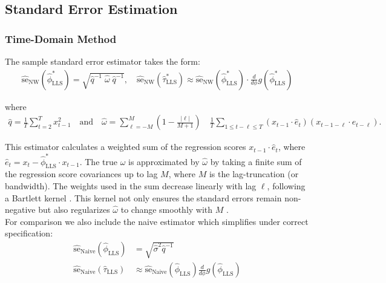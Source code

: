 \documentclass[main.tex]{subfiles}
\begin{document}
\subsection{Standard Error Estimation}
\subsubsection{Time-Domain Method}\label{sec:stderr-time-domain_}
The sample standard error estimator takes the form:
\begin{align}\label{eq:stderr-time-domain_}
\widehat{\text{se}}_{\text{NW}}(\hat\phi^*_{\scriptscriptstyle\text{LLS}}) = \sqrt{\hat q^{-1}\;\hat\omega\; \hat q^{-1}}, \quad
\widehat{\text{se}}_{\text{NW}}(\hat\tau^*_{\scriptscriptstyle\text{LLS}}) \approx \widehat{\text{se}}_{\text{NW}}(\hat\phi^*_{\scriptscriptstyle\text{LLS}}) \cdot \frac{d}{d\phi} g(\hat\phi^*_{\scriptscriptstyle\text{LLS}})
\end{align}

\noindent where
\begin{align}\label{eq:lls_q_omega_}
    \hat q = \frac{1}{T} \sum_{t=2}^T x_{t-1}^2 \quad\text{and}\quad
    \hat \omega = \sum_{\ell=-M}^M \left(1 - \frac{|\ell|}{M+1}\right) \quad \frac{1}{T} \sum_{1\le t - \ell \le T} (x_{t-1} \cdot \hat e_t)(x_{t-1-\ell} \cdot \hat e_{t-\ell}).
\end{align}

\noindent This estimator calculates a weighted sum of the regression scores $x_{t-1} \cdot \hat e_t$, where $\hat e_t = x_t - \hat\phi^*_{\scriptscriptstyle\text{LLS}} \cdot x_{t-1}$. The true $\omega$ is approximated by $\hat \omega$ by taking a finite sum of the regression score covariances up to lag $M$, where $M$ is the lag-truncation (or bandwidth). The weights used in the sum decrease linearly with lag $\ell$, following a Bartlett kernel \citep{newey_simple_1987}. This kernel not only ensures the standard errors remain non-negative but also regularizes $\hat \omega$ to change smoothly with $M$ \citep[Chapter~14.35]{hansen_econometrics_2022}.\\

\noindent For comparison we also include the naive estimator which simplifies under correct specification:
\begin{align}
    \widehat{\text{se}}_\text{Naive}(\hat\phi_{\scriptscriptstyle\text{LLS}}) &= \sqrt{\hat\sigma^2 \hat q^{-1}}\\
    \widehat{\text{se}}_\text{Naive}(\hat\tau_{\scriptscriptstyle\text{LLS}}) &\approx \widehat{\text{se}}_{\text{Naive}}(\hat\phi_{\scriptscriptstyle\text{LLS}}) \frac{d}{d\phi} g(\hat\phi_{\scriptscriptstyle\text{LLS}})
\end{align}
\end{document}
